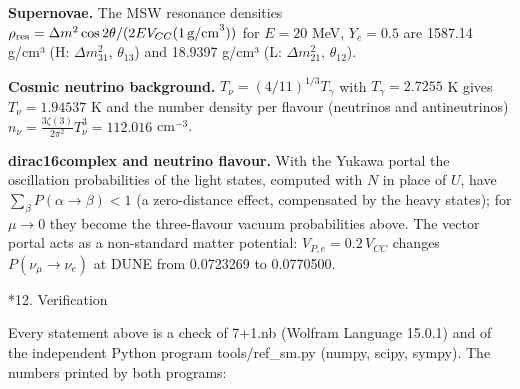 \documentclass[10pt,a4paper]{article}
\makeatletter
\renewcommand\section{\@startsection{section}{1}{\z@}{-3.5ex \@plus -1ex \@minus -.2ex}{2.3ex \@plus.2ex}{\normalfont\Large\bfseries\raggedright}}
\makeatother
\begin{document}
\textbf{Supernovae.} The MSW resonance densities $\rho_{\rm res}=\Delta m^2\cos2\theta/(2EV_{CC}(1\,\text{g/cm}^3))$ for $E=20$ MeV, $Y_e=0.5$ are 1587.14 g/cm³ (H: $\Delta m^2_{31}$, $\theta_{13}$) and 18.9397 g/cm³ (L: $\Delta m^2_{21}$, $\theta_{12}$).

\textbf{Cosmic neutrino background.} $T_\nu=(4/11)^{1/3}T_\gamma$ with $T_\gamma=2.7255$ K gives $T_\nu=1.94537$ K and the number density per flavour (neutrinos and antineutrinos) $n_\nu=\frac{3\zeta(3)}{2\pi^2}T_\nu^3=112.016$ cm$^{-3}$.

\textbf{dirac16complex and neutrino flavour.} With the Yukawa portal the oscillation probabilities of the light states, computed with $N$ in place of $U$, have $\sum_\beta P(\alpha\to\beta)<1$ (a zero-distance effect, compensated by the heavy states); for $\mu\to0$ they become the three-flavour vacuum probabilities above. The vector portal acts as a non-standard matter potential: $V_{P,e}=0.2\,V_{CC}$ changes $P(\nu_\mu\to\nu_e)$ at DUNE from 0.0723269 to 0.0770500.

\section*{12. Verification}
Every statement above is a check of 7+1.nb (Wolfram Language 15.0.1) and of the independent Python program tools/ref\_sm.py (numpy, scipy, sympy). The numbers printed by both programs:
\end{document}
